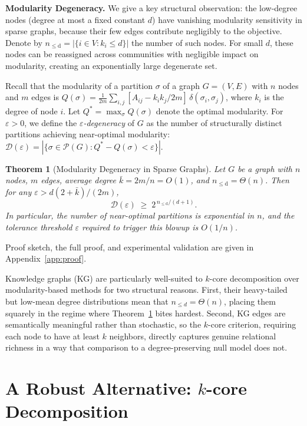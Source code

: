 \documentclass[sigconf]{acmart}
\newtheorem{theorem}{Theorem}
\newcommand{\cP}{\mathcal{P}}
\newcommand{\cD}{\mathcal{D}}
\newcommand{\kbar}{\bar{k}}
\begin{document}
{\bf Modularity Degeneracy.} We give a key structural observation: the low-degree nodes (degree at most a fixed constant $d$) have vanishing modularity sensitivity in sparse graphs, because their few edges contribute negligibly to the objective. Denote by $n_{\mathrm{\le d}} = |\{i \in V : k_i \leq d\}|$ the number of such nodes. For small $d$, these nodes can be reassigned across communities with negligible impact on modularity, creating an exponentially large degenerate set.

Recall that the modularity of a partition $\sigma$ of a graph $G = (V,E)$ with $n$ nodes and $m$ edges is $Q(\sigma) = \frac{1}{2m}\sum_{i,j}[A_{ij} - k_ik_j/2m]\,\delta(\sigma_i,\sigma_j)$, where $k_i$ is the degree of node $i$. Let $Q^* = \max_\sigma Q(\sigma)$ denote the optimal modularity. 
For $\varepsilon > 0$, we define the \emph{$\varepsilon$-degeneracy} of $G$ as the number of structurally distinct partitions achieving near-optimal modularity: $\cD(\varepsilon) = |\{\sigma \in \cP(G) : Q^* - Q(\sigma) < \varepsilon\}|$.


\begin{theorem}[Modularity Degeneracy in Sparse Graphs]\label{thm:main}
Let $G$ be a graph with $n$ nodes, $m$ edges, average degree $\kbar = 2m/n = O(1)$, and $n_{\mathrm{\le d}} = \Theta(n)$. Then for any $\varepsilon > d(2+\kbar)/(2m)$,
\[
\cD(\varepsilon) \;\geq\; 2^{\,n_{\mathrm{\le d}}/(d+1)}.
\]
In particular, the number of near-optimal partitions is exponential in $n$, and the tolerance threshold $\varepsilon$ required to trigger this blowup is $O(1/n)$.
\end{theorem}

Proof sketch, the full proof, and experimental validation are given in Appendix~\ref{app:proof}.

Knowledge graphs (KG) are particularly well-suited to $k$-core decomposition over modularity-based methods for two structural reasons. First, their heavy-tailed but low-mean degree distributions mean that $n_{\leq d}=\Theta(n)$, placing them squarely in the regime where Theorem~\ref{thm:main} bites hardest. Second, KG edges are semantically meaningful rather than stochastic, so the $k$-core criterion, requiring each node to have at least
$k$ neighbors, directly captures genuine relational richness in a way that comparison to a degree-preserving null model does not.

\section{A Robust Alternative: $k$-core Decomposition}\label{sec:proposed_heuristics}
\end{document}
